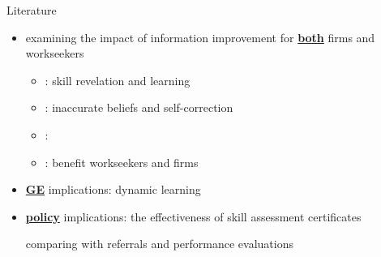 \begin{frame}{Literature}
    \begin{itemize}
        \item<2-> examining the impact of information improvement for \textbf{\color{fuzzywuzzy!65!white}\underline{both}} firms and workseekers
        {\footnotesize 
        \begin{itemize}
            \item<3->[-] : skill revelation and learning {\scriptsize \citep{kahn2014employer,arcidiacono2010beyond,heath2018firms,macleod2017big}}
            \item<4->[-] : inaccurate beliefs and self-correction {\scriptsize \citep{spinnewijn2015unemployed,ahn2019improving,banerjee2020spatial,altmann2018learning,belot2019providing}}
            \item<5->[-] : {\scriptsize \citet{abebe2021anonymity,bassi2022screening,alfonsi2020tackling,abel2020value}}
            \item<6->[-] : benefit workseekers {\scriptsize\citep{mccall2016government}} and firms {\scriptsize \citep{hoffman2018discretion}}
        \end{itemize}
        }
        \vspace*{5pt}
        \item<8-> \textbf{\color{fuzzywuzzy!65!white} \underline{GE}} implications: dynamic learning {\scriptsize \citep{gonzalez2010equilibrium,donovan2018labor,conlon2018labor}}
        \vspace*{5pt}
        \item<9-> \textbf{\color{fuzzywuzzy!65!white} \underline{policy}} implications: the effectiveness of skill assessment certificates
        
        {\scriptsize comparing with referrals \citep{beaman2012gets,beaman2018job,chandrasekhar2020network} and performance evaluations \citep{abel2020value,pallais2014inefficient}}
    \end{itemize}
    
\end{frame}

\begin{comment}





\end{comment}
